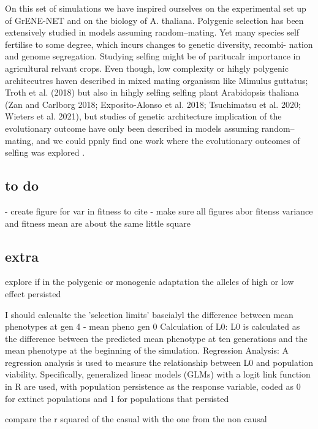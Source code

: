 \documentclass{article}
\begin{document}
On this set of simulations we have inspired ourselves on the experimental set up of GrENE-NET and on the biology of A. thaliana. 
Polygenic selection has been extensively studied in models assuming random–mating. Yet many species self fertilise to some degree, which incurs changes to genetic diversity, recombi- nation and genome segregation. Studying selfing might be of paritucalr importance in agricultural relvant crops. Even though, low complexity or hihgly polygenic architecutres haven described in mixed mating organissm like Mimulus  guttatus;  Troth et  al. (2018) but also in hihgly selfing selfing plant Arabidopsis  thaliana (Zan  and  Carlborg  2018;  Exposito-Alonso et  al. 2018;  Tsuchimatsu et al. 2020; Wieters et al. 2021), but studies of genetic architecture implication of the evolutionary outcome have only been described in models assuming random–mating, and we could ppnly find one work where the evolutionary outcomes of selfing was explored \citep{Hartfield2022-nc}.




\subsection{to do}
- create figure for var in fitness to cite
- make sure all figures abor fitenss variance and fitness mean are about the same little square 

\subsection{extra}
explore if in the polygenic or monogenic adaptation the alleles of high or low effect persisted

I should calcualte the 'selection limits' bascialyl the difference between mean phenotypes at gen 4 - mean pheno gen 0 
Calculation of L0: L0 is calculated as the difference between the predicted mean phenotype at ten generations and the mean phenotype at the beginning of the simulation.
Regression Analysis: A regression analysis is used to measure the relationship between L0 and population viability. Specifically, generalized linear models (GLMs) with a logit link function in R are used, with population persistence as the response variable, coded as 0 for extinct populations and 1 for populations that persisted

compare the r squared of the casual with the one from the non causal



\end{document}
